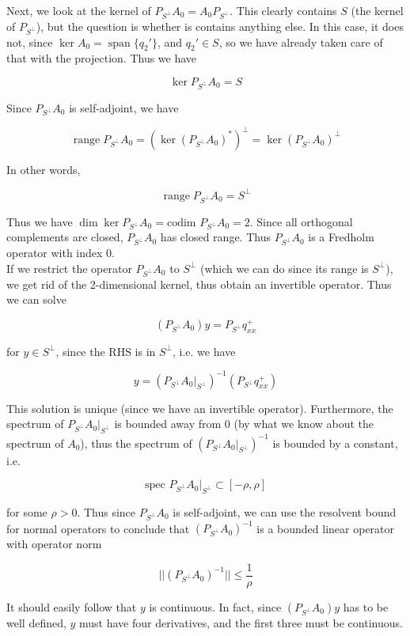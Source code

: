 \documentclass[12pt]{article}
\DeclareMathOperator{\spn}{span}
\DeclareMathOperator{\ran}{range}
\begin{document}
\begin{enumerate}
Next, we look at the kernel of $P_{S^\perp} A_0 = A_0 P_{S^\perp}$. This clearly contains $S$ (the kernel of $P_{S^\perp}$), but the question is whether is contains anything else. In this case, it does not, since $\ker A_0 = \spn\{ q_2' \}$, and $q_2' \in S$, so we have already taken care of that with the projection. Thus we have

\[
\ker P_{S^\perp} A_0 = S
\]

Since $P_{S^\perp} A_0$ is self-adjoint, we have


\[
\ran P_{S^\perp} A_0 = (\ker (P_{S^\perp} A_0)^* )^\perp = \ker(P_{S^\perp} A_0)^\perp
\]

In other words,

\[
\ran P_{S^\perp} A_0 = S^\perp
\]

Thus we have $\dim \ker P_{S^\perp} A_0 = \text{codim } P_{S^\perp} A_0 = 2$. Since all orthogonal complements are closed, $P_{S^\perp} A_0$ has closed range. Thus $P_{S^\perp} A_0$ is a Fredholm operator with index 0.\\

If we restrict the operator $P_{S^\perp} A_0$ to $S^\perp$ (which we can do since its range is $S^\perp$), we get rid of the 2-dimensional kernel, thus obtain an invertible operator. Thus we can solve

\[
(P_{S^\perp} A_0) y = P_{S^\perp} q^+_{xx}
\]

for $y \in S^\perp$, since the RHS is in $S^\perp$, i.e. we have

\[
y = (P_{S^\perp} A_0 |_{S^\perp})^{-1} (P_{S^\perp} q^+_{xx})
\]

This solution is unique (since we have an invertible operator). Furthermore, the spectrum of $P_{S^\perp} A_0 |_{S^\perp}$ is bounded away from 0 (by what we know about the spectrum of $A_0$), thus the spectrum of $(P_{S^\perp} A_0 |_{S^\perp})^{-1}$ is bounded by a constant, i.e. 

\[
\text{spec } P_{S^\perp} A_0 |_{S^\perp}  \subset [-\rho, \rho]
\]

for some $\rho > 0$. Thus since $P_{S^\perp} A_0$ is self-adjoint, we can use the resolvent bound for normal operators to conclude that $(P_{S^\perp} A_0)^{-1}$ is a bounded linear operator with operator norm

\[
|| (P_{S^\perp} A_0)^{-1} || \leq \frac{1}{\rho}
\]

It should easily follow that $y$ is continuous. In fact, since $(P_{S^\perp} A_0) y$ has to be well defined, $y$ must have four derivatives, and the first three must be continuous.


\end{enumerate}
\end{document}
